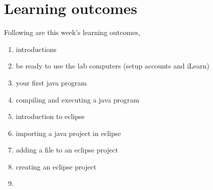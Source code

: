  
\section*{Learning outcomes}

Following are this week's learning outcomes,
\begin{enumerate}
\item introductions
\item be ready to use the lab computers (setup accounts and iLearn)
\item your first java program
\item compiling and executing a java program
\item introduction to eclipse
\item importing a java project in eclipse 
\item adding a file to an eclipse project
\item creating an eclipse project
\item \end{enumerate}

